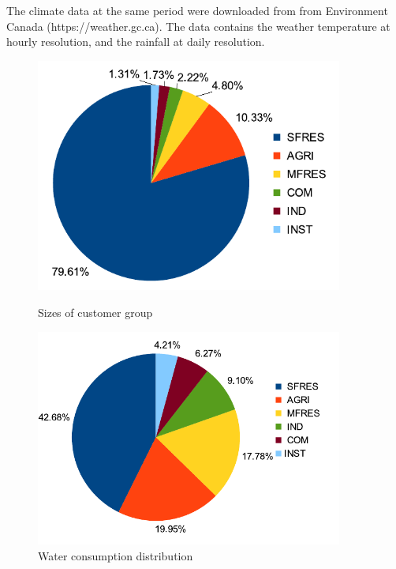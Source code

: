 \documentclass[a4paper,12pt]{llncs}
\begin{document}
The climate data at the same period were downloaded from from Environment Canada (https://weather.gc.ca). The data contains the weather temperature at hourly resolution, and the rainfall at daily resolution.
\begin{figure}[htp]
\centering
\begin{minipage}[b]{0.45\linewidth}
\includegraphics[width=0.9\textwidth]{images/watercustomergroups}
\vspace{-5pt}
\caption{Sizes of customer group}
\label{fig:watercustomergroups}
\end{minipage}
\begin{minipage}[b]{0.5\linewidth}
\includegraphics[width=0.9\textwidth]{images/waterconsumptiondist}
\vspace{-5pt}
\caption{Water consumption distribution}
\label{fig:waterconsumptiondist}
\end{minipage}
\end{figure}
\end{document}
